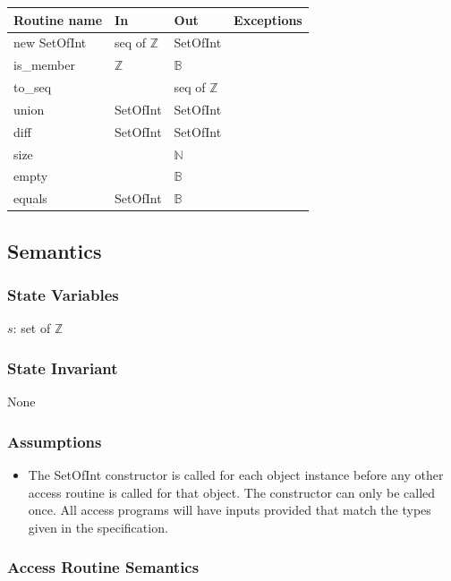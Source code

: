 \documentclass[12pt,fleqn]{examtst}
\begin{document}
\begin{tabular}{| l | l | l | p{6cm} |}
\hline
\textbf{Routine name} & \textbf{In} & \textbf{Out} & \textbf{Exceptions}\\
\hline
new SetOfInt & seq of $\mathbb{Z}$ & SetOfInt & \\
\hline
is\_member & $\mathbb{Z}$ & $\mathbb{B}$ & \\
\hline
to\_seq &  & seq of $\mathbb{Z}$ & \\
\hline
union & SetOfInt & SetOfInt & \\
\hline
diff & SetOfInt & SetOfInt & \\
\hline
size &  & $\mathbb{N}$ & \\
\hline
empty &  & $\mathbb{B}$ & \\
\hline
equals & SetOfInt & $\mathbb{B}$ & \\
\hline

\end{tabular}

\subsection* {Semantics}

\subsubsection* {State Variables}

$s$: set of $\mathbb{Z}$

\subsubsection* {State Invariant}

None

\subsubsection* {Assumptions}

\begin{itemize}
\item The SetOfInt constructor is called for each object instance before any
  other access routine is called for that object.  The constructor can only be
  called once.  All access programs will have inputs provided that match the types
  given in the specification.
\end{itemize}

\subsubsection* {Access Routine Semantics}
\end{document}
